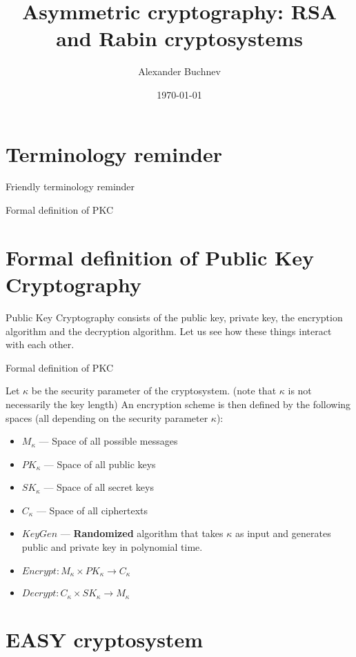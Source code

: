 \documentclass{beamer}
\title{Asymmetric cryptography: RSA and Rabin cryptosystems}
\author{Alexander Buchnev}
\date{\monthYear\today}
\begin{document}
\frame{
	\titlepage
}

\section{Terminology reminder}

\begin{frame}
    Friendly terminology reminder
\end{frame}

\begin{frame}{Formal definition of PKC}
    \section{Formal definition of Public Key Cryptography}
    Public Key Cryptography consists of the public key, private key, 
    the encryption algorithm and the decryption algorithm. Let us see how these 
    things interact with each other.
\end{frame}

\begin{frame}{Formal definition of PKC}
    \begin{definition}
        Let $\kappa$ be the security parameter of the cryptosystem. (note that 
        $\kappa$ is not necessarily the key length) An encryption scheme is then 
        defined by the following spaces (all depending on the security parameter 
        $\kappa$):
        \begin{itemize}
            \item $M_\kappa$ --- Space of all possible messages
            \item $PK_\kappa$ --- Space of all public keys
            \item $SK_\kappa$ --- Space of all secret keys
            \item $C_\kappa$ --- Space of all ciphertexts
            \item $KeyGen$ --- \textbf{Randomized} algorithm that takes $\kappa$ as input and generates
            public and private key in polynomial time. 
            \item $Encrypt : M_\kappa \times PK_\kappa \to C_\kappa$ 
            \item $Decrypt : C_\kappa \times SK_\kappa \to M_\kappa$
        \end{itemize}
    \end{definition}
\end{frame}

\section{EASY cryptosystem}
\end{document}
